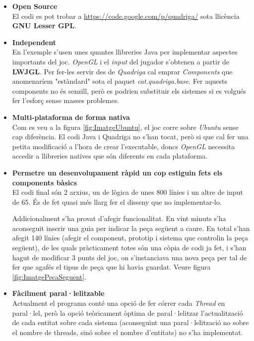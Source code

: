   \begin{itemize}
    \item {\bf Open Source} \hfill \\
      El codi es pot trobar a \url{https://code.google.com/p/quadriga/} sota llicència {\bf GNU Lesser GPL}.
      
    \item {\bf Independent} \hfill \\
      En l'exemple s'usen unes quantes llibreries Java per implementar aspectes importants del joc. {\em OpenGL} i el {\em input} del jugador s'obtenen a partir de {\bf LWJGL}. Per fer-les servir des de {\em Quadriga} cal emprar {\em Components} que anomenaríem "estàndard" sota el paquet {\em cat.quadriga.base}. Fer aquests components no és senzill, però es podrien substituir els sistemes si es volgués fer l'esforç sense masses problemes.
      
    \item {\bf Multi-plataforma de forma nativa} \hfill \\
      Com es veu a la figura \ref{fig:ImatgeUbuntu}, el joc corre sobre {\em Ubuntu} sense cap diferència. El codi Java i Quadriga no s'han tocat, però si que cal fer una petita modificació a l'hora de crear l'executable, doncs {\em OpenGL} necessita accedir a llibreries natives que són diferents en cada plataforma.
      
    \item {\bf Permetre un desenvolupament ràpid un cop estiguin fets els components bàsics} \hfill \\
      El codi final són 2 arxius, un de lògica de unes 800 línies i un altre de input de 65. És de fet quasi més llarg fer el disseny que no implementar-lo.
      
      Addicionalment s'ha provat d'afegir funcionalitat. En vint minuts s'ha aconseguit inserir una guia per indicar la peça següent a caure. En total s'han afegit 140 línies (afegir el component, prototip i sistema que controlin la peça següent), de les quals pràcticament totes són una còpia de codi ja fet, i s'han hagut de modificar 3 punts del joc, on s'instanciava una nova peça per tal de fer que agafés el tipus de peça que hi havia guardat. Veure figura \ref{fig:ImatgePecaSeguent}.
      
    \item {\bf Fàcilment paral·lelitzable} \hfill \\
      Actualment el programa conté una opció de fer córrer cada {\em Thread} en paral·lel, però la opció teòricament òptima de paral·lelitzar l'actualització de cada entitat sobre cada sistema (aconseguint una paral·lelització no sobre el nombre de threads, sinó sobre el nombre d'entitats) no s'ha implementat.
  \end{itemize}
    
